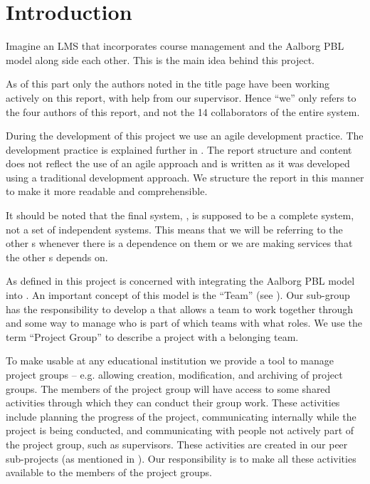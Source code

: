 \chapter{Introduction}
\label{chap:introProjectgroup}
Imagine an LMS that incorporates course management and the Aalborg PBL model along side each other.
This is the main idea behind this project.

As of this part only the authors noted in the title page have been working actively on this report, with help from our supervisor.
Hence ``we'' only refers to the four authors of this report, and not the 14 collaborators of the entire system.

During the development of this project we use an agile development practice. 
The development practice is explained further in . 
The report structure and content does not reflect the use of an agile approach and is written as it was developed using a traditional development approach. 
We structure the report in this manner to make it more readable and comprehensible. 

It should be noted that the final system, \system{}, is supposed to be a complete system, not a set of independent systems.
This means that we will be referring to the other \subsystem{}s whenever there is a dependence on them or we are making services that the other \subsystem{}s depends on.



As defined in  this project is concerned with integrating the Aalborg PBL model into \moodle.
An important concept of this model is the ``Team'' (see ).
Our sub-group has the responsibility to develop a \subsystem{} that allows a team to work together through \moodle{} and some way to manage who is part of which teams with what roles.
We use the term ``Project Group'' to describe a project with a belonging team.






To make \system{} usable at any educational institution we provide a tool to manage project groups -- e.g. allowing creation, modification, and archiving of project groups.
The members of the project group will have access to some shared activities through which they can conduct their group work.
These activities include planning the progress of the project, communicating internally while the project is being conducted, and communicating with people not actively part of the project group, such as supervisors.
These activities are created in our peer sub-projects (as mentioned in ).
Our responsibility is to make all these activities available to the members of the project groups.




